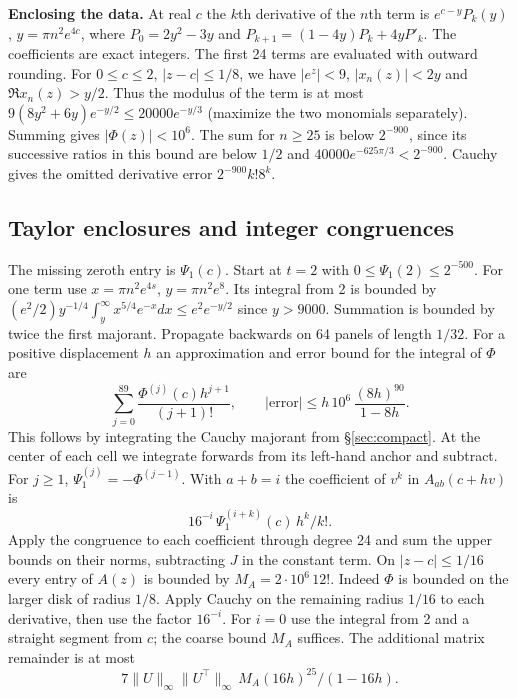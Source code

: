 \documentclass[11pt,a4paper,reqno]{amsart}
\numberwithin{equation}{section}
\begin{document}
\textbf{Enclosing the data.} At real \(c\) the \(k\)th derivative of the \(n\)th term is \(e^{c-y}P_k(y)\), \(y=\pi n^2 e^{4c}\), where \(P_0=2y^2-3y\) and \(P_{k+1}=(1-4y)P_k+4yP'_k\). The coefficients are exact integers. The first 24 terms are evaluated with outward rounding. For \(0\le c\le2\), \(|z-c|\le1/8\), we have \(|e^z|<9\), \(|x_n(z)|<2y\) and \(\Re x_n(z)>y/2\). Thus the modulus of the term is at most \(9(8y^2+6y)e^{-y/2}\le20000 e^{-y/3}\) (maximize the two monomials separately). Summing gives \(|\Phi(z)|<10^6\). The sum for \(n\ge25\) is below \(2^{-900}\), since its successive ratios in this bound are below \(1/2\) and \(40000e^{-625\pi/3}<2^{-900}\). Cauchy gives the omitted derivative error \(2^{-900}k!8^k\).

\subsection{Taylor enclosures and integer congruences}\label{sec:jet}


The missing zeroth entry is \(\Psi_1(c)\). Start at \(t=2\) with \(0\le\Psi_1(2)\le2^{-500}\). For one term use \(x=\pi n^2e^{4s}\), \(y=\pi n^2e^8\). Its integral from 2 is bounded by \((e^2/2)y^{-1/4}\int_y^\infty x^{5/4}e^{-x}dx\le e^2e^{-y/2}\) since \(y>9000\). Summation is bounded by twice the first majorant. Propagate backwards on 64 panels of length \(1/32\). For a positive displacement \(h\) an approximation and error bound for the integral of \(\Phi\) are \[\sum_{j=0}^{89}\frac{\Phi^{(j)}(c)h^{j+1}}{(j+1)!},\qquad
|\text{error}|\le h\,10^6\,\frac{(8h)^{90}}{1-8h}.\] This follows by integrating the Cauchy majorant from \S\ref{sec:compact}. At the center of each cell we integrate forwards from its left-hand anchor and subtract. For \(j\ge1\), \(\Psi_1^{(j)}=-\Phi^{(j-1)}\). With \(a+b=i\) the coefficient of \(v^k\) in \(A_{ab}(c+hv)\) is \[16^{-i}\,\Psi_1^{(i+k)}(c)\,h^k/k!.\] Apply the congruence to each coefficient through degree 24 and sum the upper bounds on their norms, subtracting \(J\) in the constant term. On \(|z-c|\le1/16\) every entry of \(A(z)\) is bounded by \(M_A=2\cdot10^6\,12!\). Indeed \(\Phi\) is bounded on the larger disk of radius \(1/8\). Apply Cauchy on the remaining radius \(1/16\) to each derivative, then use the factor \(16^{-i}\). For \(i=0\) use the integral from 2 and a straight segment from \(c\); the coarse bound \(M_A\) suffices. The additional matrix remainder is at most \[7\|U\|_\infty\|U^\top\|_\infty\,M_A(16h)^{25}/(1-16h).\] 
\end{document}
